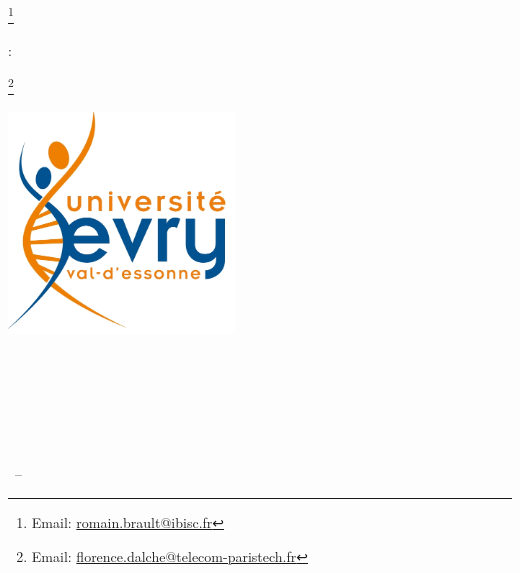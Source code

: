
\begin{titlepage}

\renewcommand*{\thefootnote}{\fnsymbol{footnote}}
\begin{addmargin}[-1cm]{-3cm}
\begin{center}
\large

\hfill
\vfill

\begingroup
\color{Maroon}\spacedallcaps{\myTitle} \\ \bigskip %
\endgroup

\spacedlowsmallcaps{\myName}\footnote{Email: \href{mailto:romain.brault@ibisc.fr}{romain.brault@ibisc.fr} } %

\vfill

\noindent {}:
\par
\mySupervisorDegree \mySupervisor\footnote{Email: \href{mailto:florence.dalche@telecom-paristech.fr}{florence.dalche@telecom-paristech.fr}}

\vfill

\includegraphics[width=6cm]{gfx/University_of_Evry_Val_d_Essonne_logo} \\ \medskip %

\mySubtitle \\ \medskip %
\myDegree \\
\myDepartment \\
\myFaculty \\
\myUni \\ \bigskip

\myTime\ -- \myVersion %

\vfill

\end{center}
\end{addmargin}

\renewcommand*{\thefootnote}{\arabic{footnote}}
\setcounter{footnote}{0}
\end{titlepage}